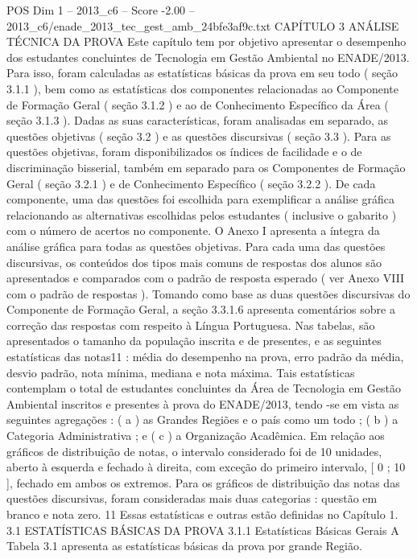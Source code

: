 \begin{textsample}{POS Dim 1 – 2013\_c6 – Score -2.00 – 2013\_c6/enade\_2013\_tec\_gest\_amb\_24bfe3af9c.txt}  \label{ex:f1_pos_180}
CAPÍTULO 3 ANÁLISE TÉCNICA DA PROVA Este capítulo tem por objetivo apresentar o desempenho dos estudantes concluintes de Tecnologia em Gestão Ambiental no ENADE/2013.
Para isso, foram calculadas as estatísticas básicas da prova em seu todo ( seção 3.1.1 ), bem como as estatísticas dos componentes relacionadas ao Componente de Formação Geral ( seção 3.1.2 ) e ao de Conhecimento Específico da Área ( seção 3.1.3 ).
Dadas as suas características, foram analisadas em separado, as questões objetivas ( seção 3.2 ) e as questões discursivas ( seção 3.3 ).
Para as questões objetivas, foram disponibilizados os índices de facilidade e o de discriminação bisserial, também em separado para os Componentes de Formação Geral ( seção 3.2.1 ) e de Conhecimento Específico ( seção 3.2.2 ).
De cada componente, uma das questões foi escolhida para exemplificar a análise gráfica relacionando as alternativas escolhidas pelos estudantes ( inclusive o gabarito ) com o número de acertos no componente.
O Anexo I apresenta a íntegra da análise gráfica para todas as questões objetivas.
Para cada uma das questões discursivas, os conteúdos dos tipos mais comuns de respostas dos alunos são apresentados e comparados com o padrão de resposta esperado ( ver Anexo VIII com o padrão de respostas ).
Tomando como base as duas questões discursivas do Componente de Formação Geral, a seção 3.3.1.6 apresenta comentários sobre a correção das respostas com respeito à Língua Portuguesa.
Nas tabelas, são apresentados o tamanho da população inscrita e de presentes, e as seguintes estatísticas das notas11 : média do desempenho na prova, erro padrão da média, desvio padrão, nota mínima, mediana e nota máxima.
Tais estatísticas contemplam o total de estudantes concluintes da Área de Tecnologia em Gestão Ambiental inscritos e presentes à prova do ENADE/2013, tendo -se em vista as seguintes agregações : ( a ) as Grandes Regiões e o país como um todo ; ( b ) a Categoria Administrativa ; e ( c ) a Organização Acadêmica.
Em relação aos gráficos de distribuição de notas, o intervalo considerado foi de 10 unidades, aberto à esquerda e fechado à direita, com exceção do primeiro intervalo, [ 0 ; 10 ], fechado em ambos os extremos.
Para os gráficos de distribuição das notas das questões discursivas, foram consideradas mais duas categorias : questão em branco e nota zero. 11 Essas estatísticas e outras estão definidas no Capítulo 1. 3.1 ESTATÍSTICAS BÁSICAS DA PROVA 3.1.1 Estatísticas Básicas Gerais A Tabela 3.1 apresenta as estatísticas básicas da prova por grande Região.

\end{textsample}
